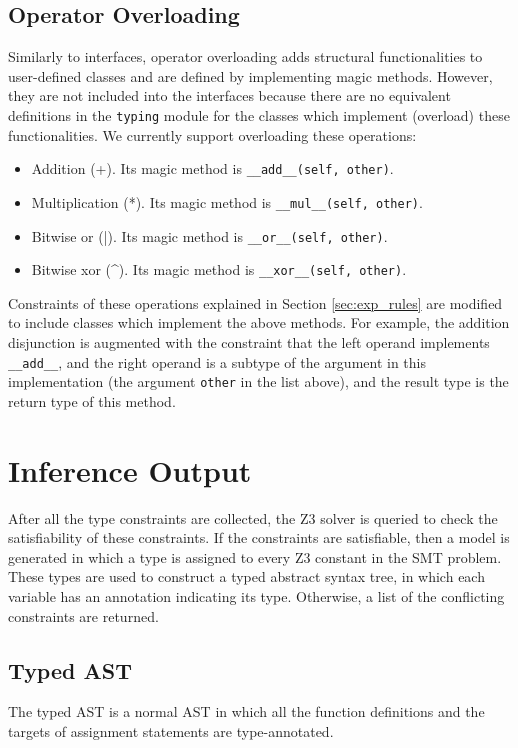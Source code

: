 \subsection{Operator Overloading}
Similarly to interfaces, operator overloading adds structural functionalities to user-defined classes and are defined by implementing magic methods. However, they are not included into the interfaces because there are no equivalent definitions in the \lstinline|typing| module for the classes which implement (overload) these functionalities. We currently support overloading these operations:
\begin{itemize}
	\item Addition (+). Its magic method is \lstinline|__add__(self, other)|.
	\item Multiplication (*). Its magic method is \lstinline|__mul__(self, other)|.
	\item Bitwise or (|). Its magic method is \lstinline|__or__(self, other)|.
	\item Bitwise xor (\textrm{\^}). Its magic method is \lstinline|__xor__(self, other)|.
\end{itemize}
Constraints of these operations explained in Section \ref{sec:exp_rules} are modified to include classes which implement the above methods. For example, the addition disjunction is augmented with the constraint that the left operand implements \lstinline|__add__|, and the right operand is a subtype of the argument in this implementation (the argument \lstinline|other| in the list above), and the result type is the return type of this method.
\section{Inference Output}
After all the type constraints are collected, the Z3 solver is queried to check the satisfiability of these constraints. If the constraints are satisfiable, then a model is generated in which a type is assigned to every Z3 constant in the SMT problem. These types are used to construct a typed abstract syntax tree, in which each variable has an annotation indicating its type. Otherwise, a list of the conflicting constraints are returned.
\subsection{Typed AST}
The typed AST is a normal AST in which all the function definitions and the targets of assignment statements are type-annotated.

